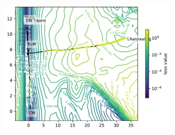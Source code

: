 \documentclass[letterpaper]{article} %
\begin{document}
                                
        \begin{figure}[htb]
            \centering
              \begin{subfigure}[b]{0.3\textwidth}
                \includegraphics[width=\textwidth]{figures/round3/MTL_PCA/directions.h5_proj_cos_residual_Convection.h5_Convection_residual_loss_2dcontour_proj.pdf}

\end{subfigure}
\end{figure}
\end{document}
